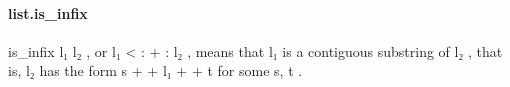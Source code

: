 \documentclass{article}
\begin{document}
\paragraph{list.is\_infix}
\par
\colorbox[RGB]{253,246,227}{{{{\color[RGB]{101, 123, 131} is\_infix l₁ l₂ }}}}, or 
\colorbox[RGB]{253,246,227}{{{{\color[RGB]{101, 123, 131} l₁  }}}{{{\color[RGB]{181, 137, 0} < }}}{{{\color[RGB]{101, 123, 131} : }}}{{{\color[RGB]{181, 137, 0} + }}}{{{\color[RGB]{101, 123, 131} : l₂ }}}}, means that 
\colorbox[RGB]{253,246,227}{{{{\color[RGB]{101, 123, 131} l₁ }}}} is a contiguous
substring of 
\colorbox[RGB]{253,246,227}{{{{\color[RGB]{101, 123, 131} l₂ }}}}, that is, 
\colorbox[RGB]{253,246,227}{{{{\color[RGB]{101, 123, 131} l₂ }}}} has the form 
\colorbox[RGB]{253,246,227}{{{{\color[RGB]{101, 123, 131} s  }}}{{{\color[RGB]{181, 137, 0} + }}}{{{\color[RGB]{181, 137, 0} + }}}{{{\color[RGB]{101, 123, 131}  l₁  }}}{{{\color[RGB]{181, 137, 0} + }}}{{{\color[RGB]{181, 137, 0} + }}}{{{\color[RGB]{101, 123, 131}  t }}}} for some 
\colorbox[RGB]{253,246,227}{{{{\color[RGB]{101, 123, 131} s, t }}}}.
\end{document}
